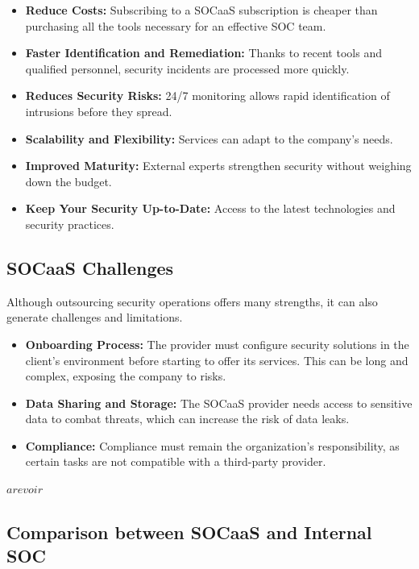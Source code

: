\begin{itemize}
    \item \textbf{Reduce Costs:} Subscribing to a SOCaaS subscription is cheaper than purchasing all the tools necessary for an effective SOC team.
    \item \textbf{Faster Identification and Remediation:} Thanks to recent tools and qualified personnel, security incidents are processed more quickly.
    \item \textbf{Reduces Security Risks:} 24/7 monitoring allows rapid identification of intrusions before they spread.
    \item \textbf{Scalability and Flexibility:} Services can adapt to the company's needs.
    \item \textbf{Improved Maturity:} External experts strengthen security without weighing down the budget.
    \item \textbf{Keep Your Security Up-to-Date:} Access to the latest technologies and security practices.
\end{itemize}

\subsection{SOCaaS Challenges}
\label{subsec:socaas-challenges}

Although outsourcing security operations offers many strengths, it can also generate challenges and limitations.

\begin{itemize}
    \item \textbf{Onboarding Process:} The provider must configure security solutions in the client's environment before starting to offer its services. This can be long and complex, exposing the company to risks.
    \item \textbf{Data Sharing and Storage:} The SOCaaS provider needs access to sensitive data to combat threats, which can increase the risk of data leaks.
    \item \textbf{Compliance:} Compliance must remain the organization's responsibility, as certain tasks are not compatible with a third-party provider.
\end{itemize}
$a revoir$
\subsection{Comparison between SOCaaS and Internal SOC}

